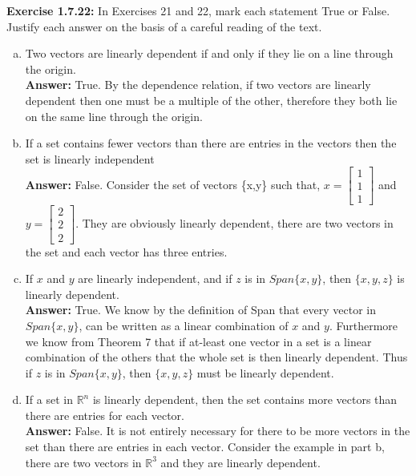 \documentclass{amsart}
\def\RR{{\mathbb R}}
\begin{document}
\noindent\textbf{Exercise 1.7.22: } In Exercises 21 and 22, mark each statement True or False. Justify each answer on the basis of a careful reading of the text.
\begin{enumerate}[(a)]
\item Two vectors are linearly dependent if and only if they lie on a line through the origin.\\
\noindent \textbf{Answer: } True. By the dependence relation, if two vectors are linearly  dependent then one must be a multiple of the other, therefore they both lie on the same line through the origin.
\vspace{1in}

\item If a set contains fewer vectors than there are entries in the vectors then the set is linearly independent\\
\noindent \textbf{Answer: }False. Consider the set of vectors \{x,y\} such that, $x=\begin{bmatrix}1\\1\\1 \end{bmatrix}$ and $y=\begin{bmatrix}2\\2\\2 \end{bmatrix}$.  They are obviously linearly dependent, there are two vectors in the set and each vector has three entries.
\vspace{1in}

\item If $x$ and $y$ are linearly independent, and if $z$ is in $Span\{x,y\}$, then $\{x,y,z\}$ is linearly dependent.\\
\noindent \textbf{Answer: } True. We know by the definition of Span that every vector in $Span\{x,y\}$, can be written as a linear combination of $x$ and $y$.  Furthermore we know from Theorem 7 that if at-least one vector in a set is a linear combination of the others that the whole set is then linearly dependent. Thus if $z$ is in $Span\{x,y\}$, then $\{x,y,z\}$ must be linearly dependent.
\vspace{1in}

\item If a set in $\RR^{n}$ is linearly dependent, then the set contains more vectors than there are entries for each vector.\\ 
\noindent \textbf{Answer: }False. It is not entirely necessary for there to be more vectors in the set than there are entries in each vector. Consider the example in part b, there are two vectors in $\RR^{3}$ and they are linearly dependent.
\vspace{1in}






\end{enumerate}
\end{document}
